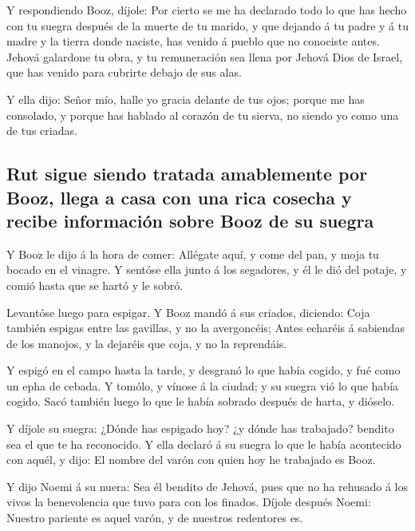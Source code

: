  Y respondiendo Booz, díjole: Por cierto se me ha
declarado todo lo que has hecho con tu suegra después de la muerte de tu
marido, y que dejando á tu padre y á tu madre y la tierra donde naciste,
has venido á pueblo que no conociste antes.  Jehová
galardone tu obra, y tu remuneración sea llena por Jehová Dios de
Israel, que has venido para cubrirte debajo de sus alas.

 Y ella dijo: Señor mío, halle yo gracia delante de tus
ojos; porque me has consolado, y porque has hablado al corazón de tu
sierva, no siendo yo como una de tus criadas.

\hypertarget{rut-sigue-siendo-tratada-amablemente-por-booz-llega-a-casa-con-una-rica-cosecha-y-recibe-informaciuxf3n-sobre-booz-de-su-suegra}{%
\subsection{Rut sigue siendo tratada amablemente por Booz, llega a casa
con una rica cosecha y recibe información sobre Booz de su
suegra}\label{rut-sigue-siendo-tratada-amablemente-por-booz-llega-a-casa-con-una-rica-cosecha-y-recibe-informaciuxf3n-sobre-booz-de-su-suegra}}

 Y Booz le dijo á la hora de comer: Allégate aquí, y come
del pan, y moja tu bocado en el vinagre. Y sentóse ella junto á los
segadores, y él le dió del potaje, y comió hasta que se hartó y le
sobró.

 Levantóse luego para espigar. Y Booz mandó á sus
criados, diciendo: Coja también espigas entre las gavillas, y no la
avergoncéis;  Antes echaréis á sabiendas de los manojos,
y la dejaréis que coja, y no la reprendáis.

 Y espigó en el campo hasta la tarde, y desgranó lo que
había cogido, y fué como un epha de cebada.  Y tomólo, y
vínose á la ciudad; y su suegra vió lo que había cogido. Sacó también
luego lo que le había sobrado después de harta, y dióselo.

 Y díjole su suegra: ¿Dónde has espigado hoy? ¿y dónde
has trabajado? bendito sea el que te ha reconocido. Y ella declaró á su
suegra lo que le había acontecido con aquél, y dijo: El nombre del varón
con quien hoy he trabajado es Booz.

 Y dijo Noemi á su nuera: Sea él bendito de Jehová, pues
que no ha rehusado á los vivos la benevolencia que tuvo para con los
finados. Díjole después Noemi: Nuestro pariente es aquel varón, y de
nuestros redentores es.

